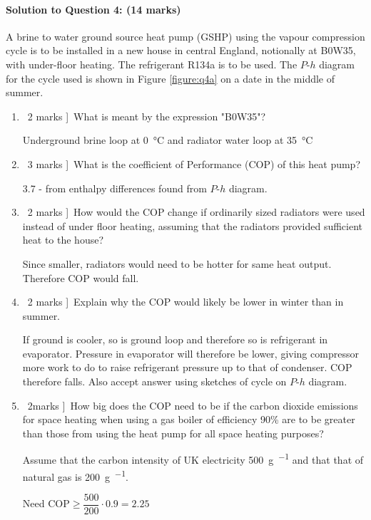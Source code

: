 \documentclass[a4paper,12pt,fleqn]{article}
\begin{document}
\paragraph{\textbf{Solution to Question 4: (14 marks)}}

A brine to water ground source heat pump (GSHP) using the vapour compression cycle is to be installed in a new house in central England, notionally at B0W35, with under-floor heating. The refrigerant R134a is to be used. The $P$-$h$ diagram for the cycle used is shown in Figure \ref{figure:q4a} on a date in the middle of summer.

\begin{enumerate} [label=\alph*)]
\item \lbrack\ 2 marks ]\ What is meant by the expression "B0W35"?\par
Underground brine loop at \SI{0}{\celsius} and radiator water loop at \SI{35}{\celsius}
\item \lbrack\ 3 marks ]\ What is the coefficient of Performance (COP) of this heat pump?\par
3.7 - from enthalpy differences found from $P$-$h$ diagram.
\item \lbrack\ 2 marks ]\ How would the COP change if ordinarily sized radiators were used instead of under floor heating, assuming that the radiators provided sufficient heat to the house?\par
Since smaller, radiators would need to be hotter for same heat output. Therefore COP would fall.
\item \lbrack\ 2 marks ]\ Explain why the COP would likely be lower in winter than in summer.\par
If ground is cooler, so is ground loop and therefore so is refrigerant in evaporator. Pressure in evaporator will therefore be lower, giving compressor more work to do to raise refrigerant pressure up to that of condenser. COP therefore falls. Also accept answer using sketches of cycle on $P$-$h$ diagram.
\item \lbrack\ 2marks ]\ How big does the COP need to be if the carbon dioxide emissions for space heating when using a gas boiler of efficiency 90\% are to be greater than those from using the heat pump for all space heating purposes? \par
Assume that the carbon intensity of UK electricity \SI{500}{\gram\per\kilowatthour} and that that of natural gas is \SI{200}{\gram\per\kilowatthour}.\par
Need $\mathrm{COP}\geq \dfrac{500}{200}\cdot0.9=2.25$


\end{enumerate}
\end{document}

